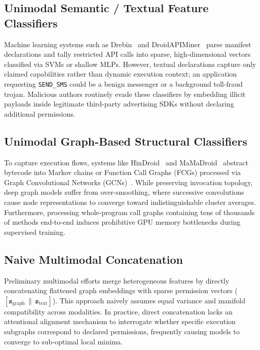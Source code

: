 \documentclass[12pt,a4paper,oneside]{report}
\begin{document}
\subsection{Unimodal Semantic / Textual Feature Classifiers}
Machine learning systems such as Drebin~\cite{ref1} and DroidAPIMiner~\cite{ref6} parse manifest declarations and tally restricted API calls into sparse, high-dimensional vectors classified via SVMs or shallow MLPs. However, textual declarations capture only claimed capabilities rather than dynamic execution context; an application requesting \texttt{SEND\_SMS} could be a benign messenger or a background toll-fraud trojan. Malicious authors routinely evade these classifiers by embedding illicit payloads inside legitimate third-party advertising SDKs without declaring additional permissions.

\subsection{Unimodal Graph-Based Structural Classifiers}
To capture execution flows, systems like HinDroid~\cite{ref3} and MaMaDroid~\cite{ref2} abstract bytecode into Markov chains or Function Call Graphs (FCGs) processed via Graph Convolutional Networks (GCNs)~\cite{ref13}. While preserving invocation topology, deep graph models suffer from over-smoothing, where successive convolutions cause node representations to converge toward indistinguishable cluster averages. Furthermore, processing whole-program call graphs containing tens of thousands of methods end-to-end induces prohibitive GPU memory bottlenecks during supervised training.

\subsection{Naive Multimodal Concatenation}
Preliminary multimodal efforts merge heterogeneous features by directly concatenating flattened graph embeddings with sparse permission vectors ($[\mathbf{z}_{\text{graph}} \,\|\, \mathbf{z}_{\text{text}}]$). This approach naively assumes equal variance and manifold compatibility across modalities. In practice, direct concatenation lacks an attentional alignment mechanism to interrogate whether specific execution subgraphs correspond to declared permissions, frequently causing models to converge to sub-optimal local minima.
\end{document}
